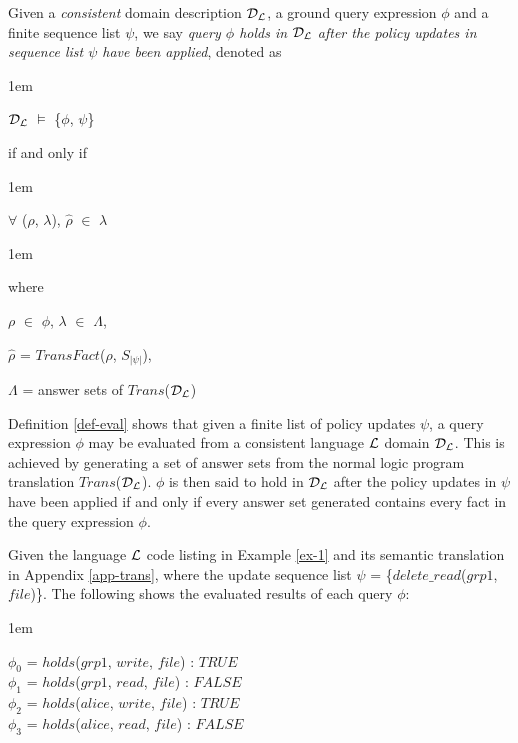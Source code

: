 \documentclass[global,twocolumn,final]{svjour}
\newenvironment{vdefinition}
  {\begin{definition}\hspace{0.25em}}
  {\end{definition}}
\newenvironment{vexample}
  {\begin{example}\hspace{0.25em}}
  {\end{example}}
\newenvironment{vquote}
  {\begin{list}{}{\leftmargin 1em}\item[]}
  {\end{list}}
\begin{document}
    \begin{vdefinition}
      \label{def-eval}
      Given a {\em consistent} domain description ${\cal D}_{\cal L}$, a ground
      query expression $\phi$ and a finite sequence list $\psi$, we say
      {\em query $\phi$ holds in ${\cal D}_{\cal L}$ after the policy updates
      in sequence list $\psi$ have been applied}, denoted as

      \begin{vquote}
        ${\cal D}_{\cal L}$ $\models$ \{$\phi$, $\psi$\}
      \end{vquote}

      \noindent
      if and only if

      \begin{vquote}
        $\forall$ ($\rho$, $\lambda$),
        $\hat{\rho}$ $\in$ $\lambda$

      \end{vquote}

      \begin{vquote}
        where

        $\rho$ $\in$ $\phi$,
        $\lambda$ $\in$ $\Lambda$,

        $\hat{\rho}$ = $TransFact$($\rho$, $S_{|\psi|}$),

        $\Lambda$ = answer sets of $Trans$(${\cal D}_{\cal L}$)
      \end{vquote}
    \end{vdefinition}

    Definition \ref{def-eval} shows that given a finite list of policy updates
    $\psi$, a query expression $\phi$ may be evaluated from a consistent
    language ${\cal L}$ domain ${\cal D_{L}}$. This is achieved by generating a
    set of answer sets from the normal logic program translation
    $Trans$(${\cal D_{L}}$). $\phi$ is then said to hold in ${\cal D_{L}}$
    after the policy updates in $\psi$ have been applied if and only if every
    answer set generated contains every fact in the query expression $\phi$.

    \begin{vexample}
      \label{ex-2}
      Given the language ${\cal L}$ code listing in Example \ref{ex-1} and its
      semantic translation in Appendix \ref{app-trans}, where the update
      sequence list $\psi$ = \{$delete\_read$($grp1$, $file$)\}. The following
      shows the evaluated results of each query $\phi$:

      \begin{vquote}
        $\phi_{0}$ = $holds$($grp1$, $write$, $file$) : $TRUE$ \\
        $\phi_{1}$ = $holds$($grp1$, $read$, $file$) : $FALSE$ \\
        $\phi_{2}$ = $holds$($alice$, $write$, $file$) : $TRUE$ \\
        $\phi_{3}$ = $holds$($alice$, $read$, $file$) : $FALSE$
      \end{vquote}
    \end{vexample}
\end{document}

